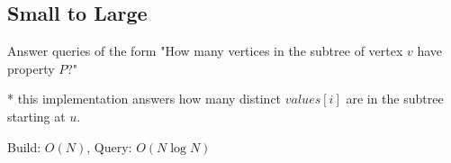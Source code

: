 \subsection{Small to Large}

Answer queries of the form "How many vertices in the subtree of vertex $v$ have property $P$?"

* this implementation answers how many distinct $values[i]$ are in the subtree starting at $u$.

Build: $O(N)$, Query: $O(N \log N)$
